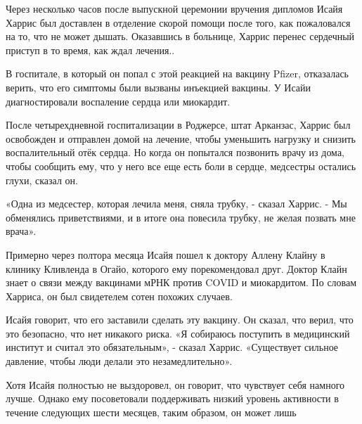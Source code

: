 Через несколько часов после выпускной церемонии вручения дипломов Исайя Харрис
был доставлен в отделение скорой помощи после того, как пожаловался на то, что
не может дышать. Оказавшись в больнице, Харрис перенес сердечный приступ в то
время, как ждал лечения..

В госпитале, в который он попал с этой реакцией на вакцину Pfizer, отказалась
верить, что его симптомы были вызваны инъекцией вакцины. У Исайи диагностировали
воспаление сердца или миокардит.

После четырехдневной госпитализации в Роджерсе, штат Арканзас, Харрис был
освобожден и отправлен домой на лечение, чтобы уменьшить нагрузку и снизить
воспалительный отёк сердца. Но когда он попытался позвонить врачу из дома, чтобы
сообщить ему, что у него все еще есть боли в сердце, медсестры остались глухи,
сказал он.

«Одна из медсестер, которая лечила меня, сняла трубку, - сказал Харрис. - Мы
обменялись приветствиями, и в итоге она повесила трубку, не желая позвать мне
врача».

Примерно через полтора месяца Исайя пошел к доктору Аллену Клайну в клинику
Кливленда в Огайо, которого ему порекомендовал друг. Доктор Клайн знает о связи
между вакцинами мРНК против COVID и миокардитом. По словам Харриса, он был
свидетелем сотен похожих случаев.

Исайя говорит, что его заставили сделать эту вакцину. Он сказал, что верил, что
это безопасно, что нет никакого риска. «Я собираюсь поступить в медицинский
институт и считал это обязательным», - сказал Харрис. «Существует сильное
давление, чтобы люди делали это незамедлительно».

Хотя Исайя полностью не выздоровел, он говорит, что чувствует себя намного
лучше. Однако ему посоветовали поддерживать низкий уровень активности в течение
следующих шести месяцев, таким образом, он может лишь


